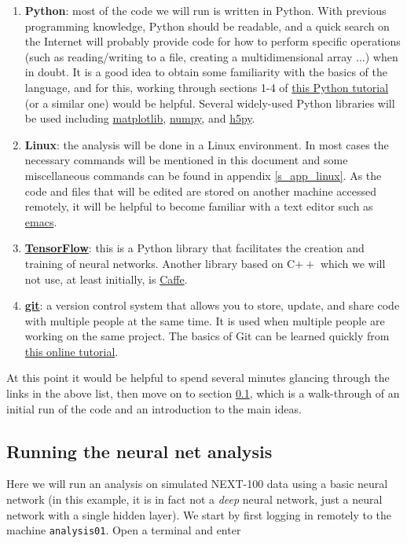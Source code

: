 \documentclass[10pt]{article}
\begin{document}
\begin{enumerate}
	\item[\textbullet] \textbf{Python}: most of the code we will run is written in Python.  With previous programming knowledge, 
	Python should be readable, and a quick search on the Internet will probably provide code for how to perform specific operations
	(such as reading/writing to a file, creating a multidimensional array ...) when in doubt.  It is a good idea to obtain some
	familiarity with the basics of the language, and for this, working through sections 1-4 of 
	\href{https://docs.python.org/2/tutorial/}{this Python tutorial} (or a similar one) would be helpful.  Several widely-used
	Python libraries will be used including \href{http://matplotlib.org}{matplotlib}, \href{http://www.numpy.org}{numpy}, and \href{http://www.h5py.org}{h5py}.
	\item[\textbullet] \textbf{Linux}: the analysis will be done in a Linux environment.  In most cases the necessary commands
	will be mentioned in this document and some miscellaneous commands can be found in appendix \ref{s_app_linux}.  As
	the code and files that will be edited are stored on another machine accessed remotely, it will be helpful to become familiar
	with a text editor such as \href{https://www.gnu.org/software/emacs}{emacs}.
	\item[\textbullet] \textbf{\href{https://www.tensorflow.org}{TensorFlow}}: this is a Python library that facilitates the creation and 
	training of neural networks.  Another library based on C$++$ which we will not use, at least initially, is \href{http://caffe.berkeleyvision.org}{Caffe}.
	\item[\textbullet] \textbf{\href{https://git-scm.com}{git}}: a version control system that allows you to store, update, and share
	code with multiple people at the same time.  It is used when multiple people are working on the same project.  The basics of Git can be learned quickly from \href{https://try.github.io}{this online tutorial}.
\end{enumerate}

\noindent At this point it would be helpful to spend several minutes glancing through the links in the above list, then
move on to section \ref{ss_basicanalysis}, which is a walk-through of an initial run of the code and
an introduction to the main ideas.

\subsection{Running the neural net analysis}\label{ss_basicanalysis}
\noindent Here we will run an analysis on simulated NEXT-100 data using a basic neural network (in this example, it is in fact not a \emph{deep} neural network, just a neural network with
a single hidden layer).  We start by first 
logging in remotely to the machine \verb|analysis01|.  Open a terminal and enter
\end{document}
